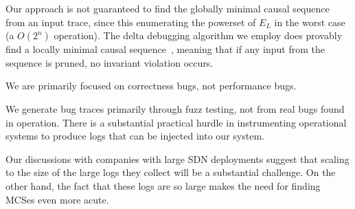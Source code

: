 Our approach is not guaranteed to find the globally minimal
causal sequence from an input trace, since this enumerating the powerset of
$E_L$ in the worst case (a $O(2^n)$ operation).
The delta debugging algorithm we employ does provably find a
locally minimal causal sequence~\cite{Zeller:1999:YMP:318773.318946},
meaning that if any input from the sequence is pruned, no invariant violation
occurs.

We are primarily focused on correctness bugs, not performance bugs.

We generate bug traces primarily through fuzz testing, not from real bugs
found in operation. There is a substantial practical hurdle in instrumenting
operational systems to produce logs that can be injected into our system. %

Our discussions with companies with large SDN deployments suggest that scaling to the size of the
large logs they collect will be a substantial challenge.
On the other hand, the fact that these logs are so large makes the need for finding MCSes even more acute.


